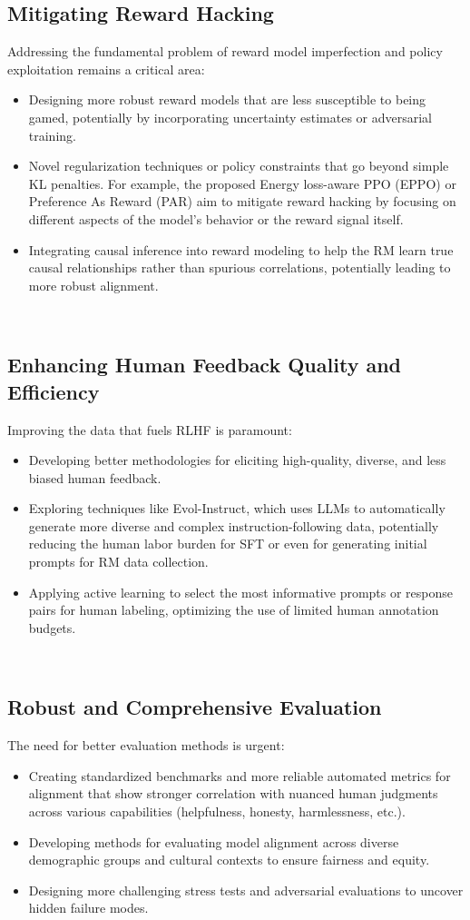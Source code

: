 \documentclass{article} %
\begin{document}
\subsection{Mitigating Reward Hacking}
Addressing the fundamental problem of reward model imperfection and policy exploitation remains a critical area:
\begin{itemize}
\item Designing more robust reward models that are less susceptible to being gamed, potentially by incorporating uncertainty estimates or adversarial training.
\item Novel regularization techniques or policy constraints that go beyond simple KL penalties. For example, the proposed Energy loss-aware PPO (EPPO) or Preference As Reward (PAR) aim to mitigate reward hacking by focusing on different aspects of the model's behavior or the reward signal itself.
\item Integrating causal inference into reward modeling to help the RM learn true causal relationships rather than spurious correlations, potentially leading to more robust alignment.
\end{itemize}  

\subsection{Enhancing Human Feedback Quality and Efficiency}
Improving the data that fuels RLHF is paramount:
\begin{itemize}
\item Developing better methodologies for eliciting high-quality, diverse, and less biased human feedback.
\item Exploring techniques like Evol-Instruct, which uses LLMs to automatically generate more diverse and complex instruction-following data, potentially reducing the human labor burden for SFT or even for generating initial prompts for RM data collection.
\item Applying active learning to select the most informative prompts or response pairs for human labeling, optimizing the use of limited human annotation budgets.
\end{itemize}  

\subsection{Robust and Comprehensive Evaluation}
The need for better evaluation methods is urgent:
\begin{itemize}
\item Creating standardized benchmarks and more reliable automated metrics for alignment that show stronger correlation with nuanced human judgments across various capabilities (helpfulness, honesty, harmlessness, etc.).
\item Developing methods for evaluating model alignment across diverse demographic groups and cultural contexts to ensure fairness and equity.
\item Designing more challenging stress tests and adversarial evaluations to uncover hidden failure modes.
\end{itemize}  
\end{document}
